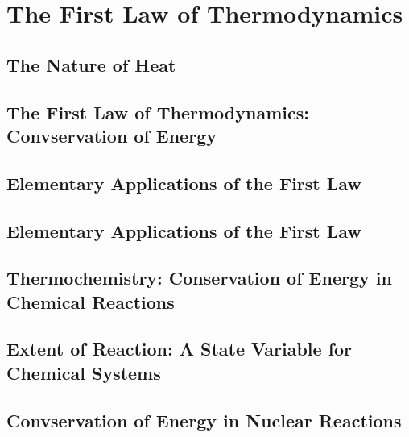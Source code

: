 \chapter{The First Law of Thermodynamics}
\section{The Nature of Heat}
\section{The First Law of Thermodynamics: Convservation of Energy}
\section{Elementary Applications of the First Law}
\section{Elementary Applications of the First Law}
\section{Thermochemistry: Conservation of Energy in Chemical Reactions}
\section{Extent of Reaction: A State Variable for Chemical Systems}
\section{Convservation of Energy in Nuclear Reactions}
